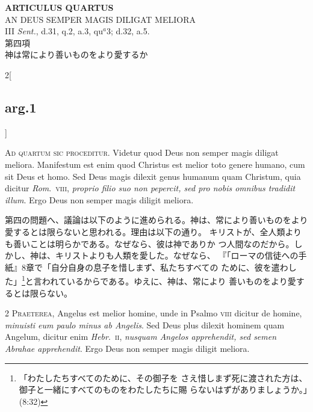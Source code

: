 \documentclass[paper=a4paper,fontsize=10pt,jafontsize=9pt,titlepage]{jlreq}
\begin{document}
{}
\setcounter{section}{4}
\setcounter{subsection}{0}
\begin{center}
 {\Large {\bfseries ARTICULUS QUARTUS}}\\
 {\large AN DEUS SEMPER MAGIS DILIGAT MELIORA}\\
 {\footnotesize III {\itshape Sent.}, d.31, q.2, a.3, qu$^a$3; d.32, a.5.}\\
 {\Large 第四項\\神は常により善いものをより愛するか}
\end{center}

\begin{paracol}{2}[\subsection{arg.1}]


{\Huge A}{\scshape d quartum sic proceditur}. Videtur quod
 Deus non semper magis diligat meliora. Manifestum est enim quod
 Christus est melior toto genere humano, cum sit Deus et homo. Sed Deus
 magis dilexit genus humanum quam Christum, quia dicitur {\itshape Rom}.~{\scshape viii},
 {\itshape proprio filio suo non pepercit, sed pro nobis omnibus tradidit
 illum}. Ergo Deus non semper magis diligit meliora.

\switchcolumn

第四の問題へ、議論は以下のように進められる。神は、常により善いものをより
 愛するとは限らないと思われる。理由は以下の通り。
キリストが、全人類よりも善いことは明らかである。なぜなら、彼は神でありか
 つ人間なのだから。しかし、神は、キリストよりも人類を愛した。なぜなら、
『「ローマの信徒への手紙』8章で「自分自身の息子を惜しまず、私たちすべての
 ために、彼を遣わした」\footnote{「わたしたちすべてのために、その御子を
 さえ惜しまず死に渡された方は、御子と一緒にすべてのものをわたしたちに賜
 らないはずがありましょうか。」(8:32)}と言われているからである。ゆえに、神は、常により
 善いものをより愛するとは限らない。



{\scshape 2 Praeterea}, Angelus est melior homine, unde in Psalmo {\scshape viii}
 dicitur de homine, {\itshape minuisti eum paulo minus ab Angelis}. Sed Deus plus
 dilexit hominem quam Angelum, dicitur enim {\itshape Hebr}.~{\scshape ii}, {\itshape nusquam Angelos
 apprehendit, sed semen Abrahae apprehendit}. Ergo Deus non semper magis
 diligit meliora.


\end{paracol}
\end{document}
